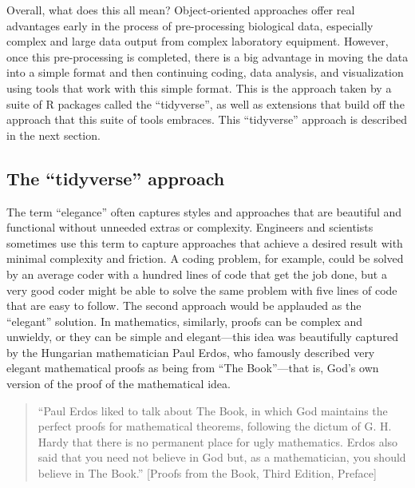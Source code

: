 \documentclass[]{tufte-book}
\begin{document}
Overall, what does this all mean? Object-oriented approaches offer real advantages
early in the process of pre-processing biological data, especially complex and
large data output from complex laboratory equipment. However, once this pre-processing
is completed, there is a big advantage in moving the data into a simple format
and then continuing coding, data analysis, and visualization using tools that
work with this simple format. This is the approach taken by a suite of R packages
called the ``tidyverse'', as well as extensions that build off the approach that
this suite of tools embraces. This ``tidyverse'' approach is described in the
next section.

\hypertarget{the-tidyverse-approach}{%
\subsection{The ``tidyverse'' approach}\label{the-tidyverse-approach}}

The term ``elegance'' often captures styles and approaches that are beautiful and
functional without unneeded extras or complexity. Engineers and scientists
sometimes use this term to capture approaches that achieve a desired result with
minimal complexity and friction. A coding problem, for example, could be solved
by an average coder with a hundred lines of code that get the job done, but a
very good coder might be able to solve the same problem with five lines of code
that are easy to follow. The second approach would be applauded as the ``elegant''
solution. In mathematics, similarly, proofs can be complex and unwieldy, or they
can be simple and elegant---this idea was beautifully captured by the Hungarian
mathematician Paul Erdos, who famously described very elegant mathematical proofs
as being from ``The Book''---that is, God's own version of the proof of the
mathematical idea.

\begin{quote}
``Paul Erdos liked to talk about The Book, in which God maintains the perfect
proofs for mathematical theorems, following the dictum of G. H. Hardy that
there is no permanent place for ugly mathematics. Erdos also said that you
need not believe in God but, as a mathematician, you should believe in
The Book.'' {[}Proofs from the Book, Third Edition, Preface{]}
\end{quote}
\end{document}
